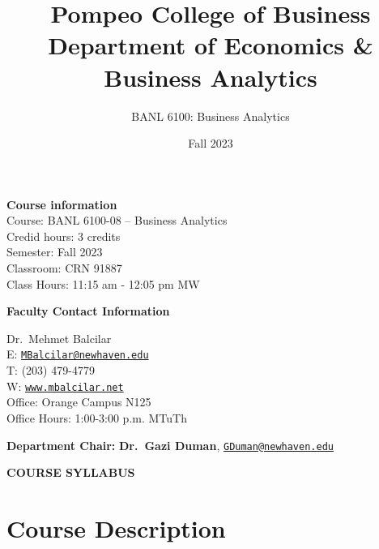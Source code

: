 \documentclass[11pt,]{article}
\title{\textcolor{unhtext}{Pompeo College of Business\\
Department of Economics \& Business Analytics}}
\subtitle{\textcolor{unhtext}{BANL 6100: Business Analytics}}
\date{\textcolor{unhtext}{Fall 2023}}
\begin{document}
  

		\maketitle
		
	
		\thispagestyle{firststyle}



\noindent\Large{\textbf{Course information}}\vspace{3pt}\\
  Course: BANL 6100-08 -- Business Analytics\\
  Credid hours: 3 credits\\
  Semester: Fall 2023\\
  Classroom: CRN 91887\\
  Class Hours: 11:15 am - 12:05 pm MW

\vspace{10pt}
\noindent\textbf{\Large{Faculty Contact Information}}
\vspace{-8pt}
\begin{multicols}{2}
  \noindent Dr.~Mehmet Balcilar\\
  E: \href{mailto:MBalcilar@newhaven.edu}{\nolinkurl{MBalcilar@newhaven.edu}}\\
    T: (203) 479-4779
  \\
   
  W: \href{http://www.mbalcilar.net}{\tt www.mbalcilar.net}
  \\
    Office: Orange Campus N125
  \\
    Office Hours: 1:00-3:00 p.m. MTuTh
  \\
    \columnbreak
    \end{multicols}
 
 \vspace{-24pt} 	
\noindent\textbf{\Large{Department Chair:}} \textbf{Dr.~Gazi
Duman}, \href{mailto:GDuman@newhaven.edu}{\nolinkurl{GDuman@newhaven.edu}}\\

\vspace{2mm}

\begin{center}
\textbf{\Large{\textcolor{unhtext}{COURSE SYLLABUS}}}
\end{center}
   
\hypertarget{course-description}{%
\section{Course Description}\label{course-description}}
\end{document}

